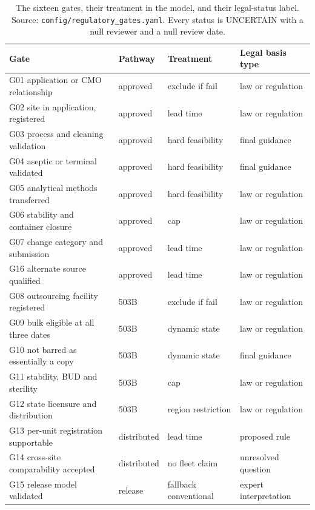 \begin{table}[htbp]
\centering
\caption{The sixteen gates, their treatment in the model, and their legal-status label. Source:
\texttt{config/regulatory\_gates.yaml}. Every status is UNCERTAIN with a null reviewer and a null
review date.}
\label{tab:gates}
\footnotesize
\setlength{\tabcolsep}{5pt}
\begin{tabular}{@{}p{6.0cm}llp{3.2cm}@{}}
\toprule
Gate & Pathway & Treatment & Legal basis type \\
\midrule
G01 application or CMO relationship & approved & exclude if fail & law or regulation \\
G02 site in application, registered & approved & lead time & law or regulation \\
G03 process and cleaning validation & approved & hard feasibility & final guidance \\
G04 aseptic or terminal validated & approved & hard feasibility & final guidance \\
G05 analytical methods transferred & approved & hard feasibility & law or regulation \\
G06 stability and container closure & approved & cap & law or regulation \\
G07 change category and submission & approved & lead time & law or regulation \\
G16 alternate source qualified & approved & lead time & law or regulation \\
G08 outsourcing facility registered & 503B & exclude if fail & law or regulation \\
G09 bulk eligible at all three dates & 503B & dynamic state & law or regulation \\
G10 not barred as essentially a copy & 503B & dynamic state & final guidance \\
G11 stability, BUD and sterility & 503B & cap & law or regulation \\
G12 state licensure and distribution & 503B & region restriction & law or regulation \\
G13 per-unit registration supportable & distributed & lead time & proposed rule \\
G14 cross-site comparability accepted & distributed & no fleet claim & unresolved question \\
G15 release model validated & release & fallback conventional & expert interpretation \\
\bottomrule
\end{tabular}
\end{table}

